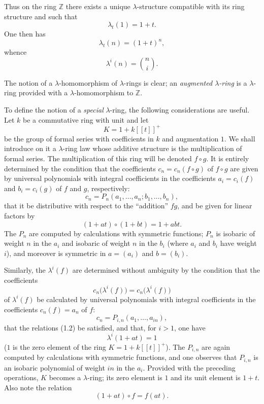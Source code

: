 \documentclass[11pt]{article}
\providecommand{\Z}{\mathbb Z}
\begin{document}
Thus on the ring $\Z$ there exists a unique $\lambda$-structure compatible with its ring structure and such that
\begin{equation}\tag{1.4}
\lambda_t(1)=1+t .
\end{equation}
One then has
\begin{equation}\tag{1.5}
\lambda_t(n)=(1+t)^n,
\end{equation}
whence
\[
\lambda^i(n)=\binom{n}{i}.
\]

The notion of a $\lambda$-homomorphism of $\lambda$-rings is clear; an \emph{augmented $\lambda$-ring} is a $\lambda$-ring provided with a $\lambda$-homomorphism to $\Z$.

To define the notion of a \emph{special} $\lambda$-ring, the following considerations are useful. Let $k$ be a commutative ring with unit and let
\[
K=1+k[[t]]^+
\]
be the group of formal series with coefficients in $k$ and augmentation $1$. We shall introduce on it a $\lambda$-ring law whose additive structure is the multiplication of formal series. The multiplication of this ring will be denoted $f\circ g$. It is entirely determined by the condition that the coefficients $c_n=c_n(f\circ g)$ of $f\circ g$ are given by universal polynomials with integral coefficients in the coefficients $a_i=c_i(f)$ and $b_i=c_i(g)$ of $f$ and $g$, respectively:
\begin{equation}\tag{1.6}
c_n=P_n(a_1,\ldots,a_n;b_1,\ldots,b_n),
\end{equation}
that it be distributive with respect to the ``addition'' $fg$, and be given for linear factors by
\begin{equation}\tag{1.7}
(1+at)\circ(1+bt)=1+abt.
\end{equation}
The $P_n$ are computed by calculations with symmetric functions; $P_n$ is isobaric of weight $n$ in the $a_i$ and isobaric of weight $n$ in the $b_i$ (where $a_i$ and $b_i$ have weight $i$), and moreover is symmetric in $a=(a_i)$ and $b=(b_i)$.

Similarly, the $\lambda^i(f)$ are determined without ambiguity by the condition that the coefficients
\[
c_n\bigl(\lambda^i(f)\bigr)=c_n\bigl(\lambda^i(f)\bigr)
\]
of $\lambda^i(f)$ be calculated by universal polynomials with integral coefficients in the coefficients $c_n(f)=a_n$ of $f$:
\begin{equation}\tag{1.8}
c_n=P_{i,n}(a_1,\ldots,a_{in}),
\end{equation}
that the relations (1.2) be satisfied, and that, for $i>1$, one have
\begin{equation}\tag{1.9}
\lambda^i(1+at)=1
\end{equation}
($1$ is the zero element of the ring $K=1+k[[t]]^+$). The $P_{i,n}$ are again computed by calculations with symmetric functions, and one observes that $P_{i,n}$ is an isobaric polynomial of weight $in$ in the $a_i$. Provided with the preceding operations, $K$ becomes a $\lambda$-ring; its zero element is $1$ and its unit element is $1+t$. Also note the relation
\begin{equation}\tag{1.7 bis}
(1+at)\circ f=f(at).
\end{equation}
\end{document}
